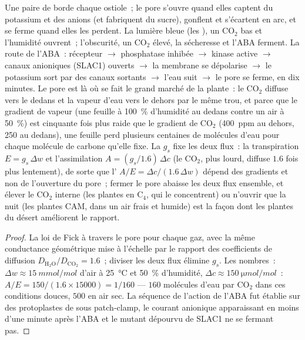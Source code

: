 \begin{proposition}\label{prop:b3:plant-molecular-physiology:stomata}
Une paire de \emph{} borde chaque ostiole~; le pore
s'ouvre quand elles captent du potassium et des anions (et fabriquent du
sucre), gonflent et s'écartent en arc, et se ferme quand elles les
perdent. La lumière bleue (les ), un CO$_{2}$ bas et
l'humidité ouvrent~; l'obscurité, un CO$_{2}$ élevé, la sécheresse et
l'ABA ferment. La route de l'ABA~: récepteur $\to$ phosphatase inhibée
$\to$ kinase active $\to$ canaux anioniques (SLAC1) ouverts $\to$ la
membrane se dépolarise $\to$ le potassium sort par des canaux sortants
$\to$ l'eau suit $\to$ le pore se ferme, en dix minutes. Le pore est là
où se fait le grand marché de la plante~: le CO$_{2}$ diffuse vers le
dedans et la vapeur d'eau vers le dehors par le même trou, et parce que
le gradient de vapeur (une feuille à \qty{100}{\%} d'humidité au dedans
contre un air à \qty{50}{\%}) est cinquante fois plus raide que le
gradient de CO$_{2}$ (\qty{400}{ppm} au dehors, \qty{250}{} au dedans),
une feuille perd plusieurs centaines de molécules d'eau pour chaque
molécule de carbone qu'elle fixe. La \emph{}
$g_{s}$ fixe les deux flux~: la transpiration $E = g_{s}\,\Delta w$ et
l'assimilation $A = (g_{s}/1.6)\,\Delta c$ (le CO$_{2}$, plus lourd,
diffuse $1.6$ fois plus lentement), de sorte que l'\emph{} $A/E = \Delta c/(1.6\,\Delta w)$ dépend des
gradients et non de l'ouverture du pore~; fermer le pore abaisse les
deux flux ensemble, et élever le CO$_{2}$ interne (les plantes en
C$_{4}$, qui le concentrent) ou n'ouvrir que la nuit (les plantes CAM,
dans un air frais et humide) est la façon dont les plantes du désert
améliorent le rapport.
\end{proposition}
\begin{proof}
La loi de Fick à travers le pore pour chaque gaz, avec la même
conductance géométrique mise à l'échelle par le rapport des coefficients
de diffusion $D_{\mathrm{H_2O}}/D_{\mathrm{CO_2}} = 1.6$~; diviser les
deux flux élimine $g_{s}$. Les nombres~: $\Delta w \approx \qty{15}{mmol/mol}$
d'air à \qty{25}{\celsius} et \qty{50}{\%} d'humidité, $\Delta c \approx
\qty{150}{\micro mol/mol}$~: $A/E = 150/(1.6\times\num{15000}) = 1/160$
--- $160$ molécules d'eau par CO$_{2}$ dans ces conditions douces, $500$
en air sec. La séquence de l'action de l'ABA fut établie sur des
protoplastes de  sous patch-clamp, le courant anionique
apparaissant en moins d'une minute après l'ABA et le mutant dépourvu de
SLAC1 ne se fermant pas.
\end{proof}

